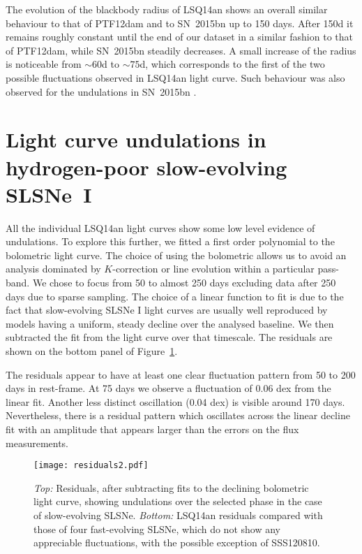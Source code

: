 \documentclass[useAMS,usenatbib]{mn2e}
\def\an{LSQ14an}
\begin{document}
The evolution of the blackbody radius of  \an\/ shows an overall similar behaviour to that of PTF12dam and to SN~2015bn up to 150 days. After 150d it remains roughly constant until the end of our dataset in a similar fashion to that of PTF12dam, while SN~2015bn steadily decreases. A small increase of the radius is noticeable from $\sim$60d to $\sim75$d, 
which corresponds to the first of the two possible fluctuations observed in \an\/ light curve. Such behaviour was also observed for the undulations in SN~2015bn \citep{ni16a}.



\section{Light curve undulations in hydrogen-poor slow-evolving SLSNe~I}\label{sec:und}

All the individual \an\/  light curves show some low level evidence of undulations. To explore this further, we fitted a first order polynomial to the bolometric light curve. The choice of using the bolometric allows us  to avoid an analysis dominated by $K$-correction or line evolution within a particular pass-band. We chose to focus  from 50 to almost 250 days excluding data after 250 days due to sparse sampling. 
 The choice of a linear function to fit is due to the fact that slow-evolving SLSNe I light curves are usually well reproduced by models having a uniform, steady decline over the analysed baseline. We then subtracted the fit from the light curve over that timescale. The residuals are shown on the bottom panel of Figure~\ref{fig:res}. 

The residuals appear to have at least one clear fluctuation pattern from 50 to 200 days in rest-frame. At 75 days we observe a fluctuation of 0.06 dex from the linear fit.  Another less distinct oscillation (0.04 dex) is visible around 170 days. Nevertheless, there is a residual pattern which oscillates across the linear decline fit with an amplitude that appears larger than the errors on the flux measurements. 

\begin{figure}
\texttt{[image: residuals2.pdf]}
\caption{{\it Top:} Residuals, after subtracting fits to the declining bolometric light curve, showing undulations over the selected phase in the case of slow-evolving SLSNe. {\it Bottom:} LSQ14an residuals compared with those of four fast-evolving SLSNe, which do not show any appreciable fluctuations, with the possible exception of SSS120810.}
\label{fig:res}
\end{figure}
\end{document}
